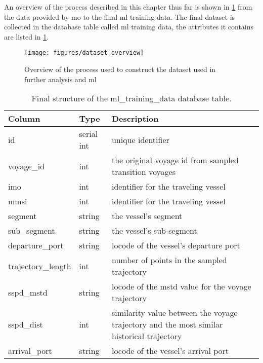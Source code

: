 An overview of the process described in this chapter thus far is shown in \cref{fig:dataset_overview} from the data provided by \acrfull{mo} to the final \acrshort{ml} training data. The final dataset is collected in the database table called \acrshort{ml} training data, the attributes it contains are listed in \cref{tab:ml_training_data}.

\begin{figure}[htbp]  %
    \centering
    \texttt{[image: figures/dataset\_overview]}
    \caption{Overview of the process used to construct the dataset used in further analysis and \acrshort{ml}}
    \label{fig:dataset_overview}
\end{figure}
\begin{table}[htbp]
    \centering
    \small{\begin{tabularx}{1.0\textwidth}{p{1.0in} p{0.75in} X}
        \bfseries{Column} & \bfseries{Type} & \bfseries{Description} \\ \toprule
        id & serial int & unique identifier \\ \midrule
        voyage\_id & int & the original voyage id from sampled transition voyages \\ \midrule
        imo & int & identifier for the traveling vessel\\ \midrule
        mmsi & int & identifier for the traveling vessel\\ \midrule
        segment & string & the vessel's segment \\ \midrule
        sub\_segment & string & the vessel's sub-segment \\ \midrule
        departure\_port & string & \gls{locode} of the vessel's departure port \\ \midrule
        trajectory\_length & int & number of points in the sampled trajectory \\ \midrule
        sspd\_mstd & string & \gls{locode} of the \acrshort{mstd} value for the voyage trajectory \\ \midrule
        sspd\_dist & int & similarity value between the voyage trajectory and the most similar historical trajectory   \\ \midrule
        arrival\_port & string & \gls{locode} of the vessel's arrival port \\ \bottomrule
    \end{tabularx}}
\caption{Final structure of the ml\_training\_data database table.}\label{tab:ml_training_data}
\end{table}


